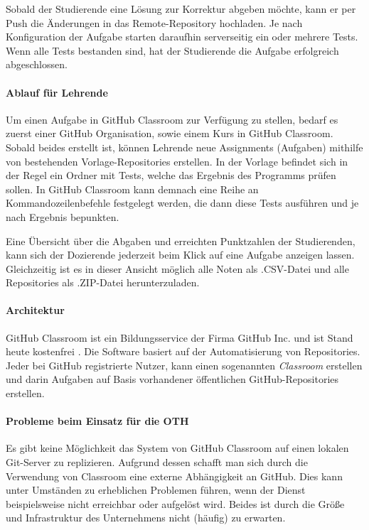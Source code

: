 Sobald der Studierende eine Lösung zur Korrektur abgeben möchte, kann er per
Push die Änderungen in das Remote-Repository hochladen. Je nach Konfiguration
der Aufgabe starten daraufhin serverseitig ein oder mehrere Tests. Wenn alle
Tests bestanden sind, hat der Studierende die Aufgabe erfolgreich abgeschlossen.

\paragraph{Ablauf für Lehrende}
Um einen Aufgabe in GitHub Classroom zur Verfügung zu stellen, bedarf es zuerst
einer GitHub Organisation, sowie einem Kurs in GitHub Classroom. Sobald beides
erstellt ist, können Lehrende neue Assignments (Aufgaben) mithilfe von
bestehenden Vorlage-Repositories erstellen. In der Vorlage befindet sich in der
Regel ein Ordner mit Tests, welche das Ergebnis des Programms prüfen sollen.
In GitHub Classroom kann demnach eine Reihe an Kommandozeilenbefehle festgelegt
werden, die dann diese Tests ausführen und je nach Ergebnis bepunkten.

Eine Übersicht über die Abgaben und erreichten Punktzahlen der Studierenden,
kann sich der Dozierende jederzeit beim Klick auf eine Aufgabe anzeigen lassen.
Gleichzeitig ist es in dieser Ansicht möglich alle Noten als .CSV-Datei und
alle Repositories als .ZIP-Datei herunterzuladen.

\paragraph{Architektur} %
GitHub Classroom ist ein Bildungsservice der Firma GitHub Inc. und ist Stand
heute kostenfrei \parencite{github-classroom-kostenlos}. Die Software basiert
auf der Automatisierung von Repositories. Jeder bei GitHub registrierte Nutzer,
kann einen sogenannten \emph{Classroom} erstellen und darin Aufgaben auf
Basis vorhandener öffentlichen GitHub-Repositories erstellen.

\paragraph{Probleme beim Einsatz für die OTH}
Es gibt keine Möglichkeit das System von GitHub Classroom auf einen lokalen
Git-Server zu replizieren. Aufgrund dessen schafft man sich durch die
Verwendung von Classroom eine externe Abhängigkeit an GitHub. Dies kann unter
Umständen zu erheblichen Problemen führen, wenn der Dienst beispielsweise
nicht erreichbar oder aufgelöst wird. Beides ist durch die Größe und
Infrastruktur des Unternehmens nicht (häufig) zu erwarten.

